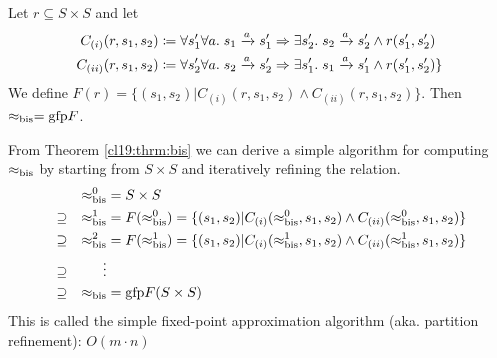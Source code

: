 \begin{theorem}
    \label{cl19:thrm:bis}
    Let $r \subseteq S\times S$ and let 
    \begin{align*}
        C_{(i)}(r,s_1, s_2)&\coloneqq \forall s_1' \forall a.\;  s_1 \xrightarrow{a} s_1' \Rightarrow \exists s_2'.\;  s_2 \xrightarrow{a} s_2' \wedge r(s_1',s_2') \\
        C_{(ii)}(r,s_1, s_2)&\coloneqq \forall s_2' \forall a .\; s_2 \xrightarrow{a} s_2' \Rightarrow \exists s_1'.\;  s_1 \xrightarrow{a} s_1' \wedge r(s_1',s_2') \}
    \end{align*}
    We define $F(r) = \{(s_1,s_2) | C_{(i)}(r,s_1, s_2) \land C_{(ii)}(r,s_1, s_2)\}$. 
    Then $\approx_{\mathrm{bis}} = \mathrm{gfp} F$.
\end{theorem}

\begin{remark}
    From Theorem \ref{cl19:thrm:bis} we can derive a simple algorithm for computing $\approx_{\mathrm{bis}}$ by starting from $S\times S$ and iteratively refining the relation. 
    \begin{align*}
        && \approx_{\mathrm{bis}}^{0} &= S\times S \\
       &\supseteq & \approx_{\mathrm{bis}}^{1} &= F(\approx_{\mathrm{bis}}^{0}) =  \{(s_1,s_2) | C_{(i)}(\approx_{\mathrm{bis}}^{0},s_1, s_2) \land C_{(ii)}(\approx_{\mathrm{bis}}^{0},s_1, s_2)\}\\ 
       & \supseteq & \approx_{\mathrm{bis}}^{2} &= F(\approx_{\mathrm{bis}}^{1}) =  \{(s_1,s_2) | C_{(i)}(\approx_{\mathrm{bis}}^{1},s_1, s_2) \land C_{(ii)}(\approx_{\mathrm{bis}}^{1},s_1, s_2)\}\\ 
        &\supseteq & \vdots \\
        & \supseteq & \approx_{\mathrm{bis}} &= \mathrm{gfp} F(S\times S)
    \end{align*}
    This is called the simple fixed-point approximation algorithm (aka. partition refinement): $O(m\cdot n)$
\end{remark}


